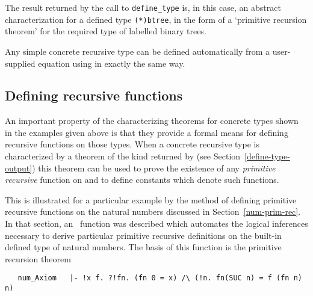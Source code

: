 \noindent The result returned by the call to {\small \verb!define_type!} is,
in this case, an abstract
characterization for a defined type {\small\verb!(*)btree!},
in the form of a `primitive recursion theorem' for the required
type of labelled binary trees.

Any simple  concrete  recursive  type  can  be  defined  automatically  from  a
user-supplied equation using  in exactly the same way.

\subsection{Defining recursive functions}\label{prim-rec-defs}

An important property of the characterizing theorems for concrete types
shown in the examples given above is that they
provide a formal
means for defining recursive functions on those types.
When a concrete
recursive type   is
 characterized by a theorem of the kind returned by
 (see Section~\ref{define-type-output}) this theorem
can be used to
prove the existence of any
{\it primitive recursive\/} function on  and to
define constants which denote such functions.

This is illustrated
for a particular
example by the method of defining primitive recursive functions on
the natural numbers  discussed in Section~\ref{num-prim-rec}.  In that section,
an \ML\ function 
 was described which automates
the logical inferences necessary to derive particular primitive recursive
definitions on the built-in defined type  of natural numbers.  The
basis of this function is the primitive recursion theorem

\begin{hol}
\begin{verbatim}
   num_Axiom   |- !x f. ?!fn. (fn 0 = x) /\ (!n. fn(SUC n) = f (fn n) n)
\end{verbatim}\end{hol}


